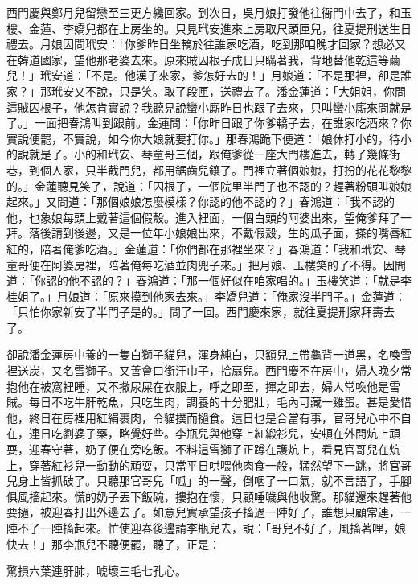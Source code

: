 西門慶與鄭月兒留戀至三更方纔回家。到次日，吳月娘打發他往衙門中去了，和玉樓、金蓮、李嬌兒都在上房坐的。只見玳安進來上房取尺頭匣兒，往夏提刑送生日禮去。月娘因問玳安：「你爹昨日坐轎於往誰家吃酒，吃到那咱晚才回家？想必又在韓道國家，望他那老婆去來。原來賊囚根子成日只瞞著我，背地替他乾這等繭兒！」玳安道：「不是。他漢子來家，爹怎好去的！」月娘道：「不是那裡，卻是誰家？」那玳安又不說，只是笑。取了段匣，送禮去了。潘金蓮道：「大姐姐，你問這賊囚根子，他怎肯實說？我聽見說蠻小廝昨日也跟了去來，只叫蠻小廝來問就是了。」一面把春鴻叫到跟前。金蓮問：「你昨日跟了你爹轎子去，在誰家吃酒來？你實說便罷，不實說，如今你大娘就要打你。」那春鴻跪下便道：「娘休打小的，待小的說就是了。小的和玳安、琴童哥三個，跟俺爹從一座大門樓進去，轉了幾條街巷，到個人家，只半截門兒，都用鋸齒兒鑲了。門裡立著個娘娘，打扮的花花黎黎的。」金蓮聽見笑了，說道：「囚根子，一個院里半門子也不認的？趕著粉頭叫娘娘起來。」又問道：「那個娘娘怎麼模樣？你認的他不認的？」春鴻道：「我不認的他，也象娘每頭上戴著這個假殼。進入裡面，一個白頭的阿婆出來，望俺爹拜了一拜。落後請到後邊，又是一位年小娘娘出來，不戴假殼，生的瓜子面，搽的嘴唇紅紅的，陪著俺爹吃酒。」金蓮道：「你們都在那裡坐來？」春鴻道：「我和玳安、琴童哥便在阿婆房裡，陪著俺每吃酒並肉兜子來。」把月娘、玉樓笑的了不得。因問道：「你認的他不認的？」春鴻道：「那一個好似在咱家唱的。」玉樓笑道：「就是李桂姐了。」月娘道：「原來摸到他家去來。」李嬌兒道：「俺家沒半門子。」金蓮道：「只怕你家新安了半門子是的。」問了一回。西門慶來家，就往夏提刑家拜壽去了。

卻說潘金蓮房中養的一隻白獅子貓兒，渾身純白，只額兒上帶龜背一道黑，名喚雪裡送炭，又名雪獅子。又善會口銜汗巾子，拾扇兒。西門慶不在房中，婦人晚夕常抱他在被窩裡睡，又不撒尿屎在衣服上，呼之即至，揮之即去，婦人常喚他是雪賊。每日不吃牛肝乾魚，只吃生肉，調養的十分肥壯，毛內可藏一雞蛋。甚是愛惜他，終日在房裡用紅絹裹肉，令貓撲而撾食。這日也是合當有事，官哥兒心中不自在，連日吃劉婆子藥，略覺好些。李瓶兒與他穿上紅緞衫兒，安頓在外間炕上頑耍，迎春守著，奶子便在旁吃飯。不料這雪獅子正蹲在護炕上，看見官哥兒在炕上，穿著紅衫兒一動動的頑耍，只當平日哄喂他肉食一般，猛然望下一跳，將官哥兒身上皆抓破了。只聽那官哥兒「呱」的一聲，倒咽了一口氣，就不言語了，手腳俱風搐起來。慌的奶子丟下飯碗，摟抱在懷，只顧唾噦與他收驚。那貓還來趕著他要撾，被迎春打出外邊去了。如意兒實承望孩子搐過一陣好了，誰想只顧常連，一陣不了一陣搐起來。忙使迎春後邊請李瓶兒去，說：「哥兒不好了，風搐著哩，娘快去！」那李瓶兒不聽便罷，聽了，正是：

驚損六葉連肝肺，唬壞三毛七孔心。

